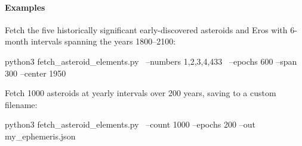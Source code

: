 \paragraph{Examples}
 
Fetch the five historically significant early-discovered asteroids and
Eros with 6-month intervals spanning the years 1800--2100:
\begin{commands}
python3 fetch_asteroid_elements.py \
    --numbers 1,2,3,4,433 \
    --epochs 600 --span 300 --center 1950
\end{commands}
 
\noindent Fetch 1000 asteroids at yearly intervals over 200 years,
saving to a custom filename:
\begin{commands}
python3 fetch_asteroid_elements.py \
    --count 1000 --epochs 200 --out my_ephemeris.json
\end{commands}



